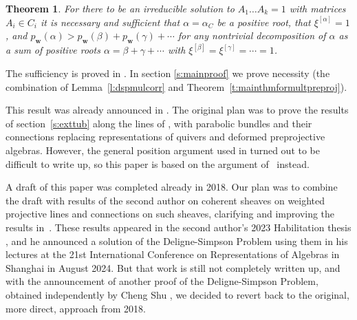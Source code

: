 \documentclass[12pt,a4paper]{amsart}
\theoremstyle{plain}
\newtheorem{thm}{Theorem}[section]
\newcommand{\bw}{\mathbf w}
\begin{document}
\begin{thm}
\label{t:dsp}
For there to be an irreducible solution to $A_1\dots A_k = 1$ with matrices $A_i\in C_i$
it is necessary and sufficient that $\alpha=\alpha_C$ be a positive root, that
$\xi^{[\alpha]}=1$, and $p_\bw(\alpha) > p_\bw(\beta)+p_\bw(\gamma)+\cdots$ for
any nontrivial decomposition of $\alpha$ as a sum of positive roots
$\alpha = \beta+\gamma+\cdots$ with $\xi^{[\beta]} = \xi^{[\gamma]} = \cdots = 1$.
\end{thm}


The sufficiency is proved in \cite{CBSh}. In section \ref{s:mainproof} we prove necessity (the combination of Lemma~\ref{l:dspmulcorr} and Theorem~\ref{t:mainthmformultpreproj}). 


This result was already announced in \cite{CBicm}. The original plan was to prove the results of section~\ref{s:exttub} along the lines of \cite[Theorem 9.1]{CBmm}, with parabolic bundles and their connections replacing representations of quivers and deformed preprojective algebras. However, the general position argument used in \cite{CBmm} turned out to be difficult to write up, so this paper is based on the argument of~\cite{CBHu} instead.

A draft of this paper was completed already in 2018. Our plan was to combine the draft with results of the second author on coherent sheaves on weighted projective lines and connections on such sheaves, clarifying and improving the results in~\cite{CBcw}.
These results appeared in the second author's 2023 Habilitation thesis \cite{Hh}, and he announced a solution of the Deligne-Simpson Problem using them in his lectures at the 21st International Conference on Representations of Algebras in Shanghai in August 2024. But that work is still not completely written up, and with the announcement of another proof of the Deligne-Simpson Problem, obtained independently by Cheng Shu \cite{Shu}, we decided to revert back to the original, more direct, approach from 2018.
\end{document}
